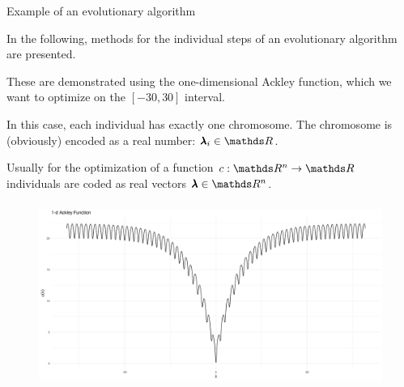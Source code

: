 \begin{frame}[allowframebreaks]{Example of an evolutionary algorithm}

In the following, methods for the individual steps of an evolutionary algorithm are presented.

\vspace{0.5cm}

These are demonstrated using the one-dimensional Ackley function, which we want to optimize on the $[-30, 30]$ interval.

\vspace{0.5cm}

In this case, each individual has exactly one chromosome. The chromosome is (obviously) encoded as a real number: $\xx_i \in \R$.

Usually for the optimization of a function $\f:\R^n \to \R$ individuals are coded as real vectors $\xx \in \R^n$.


\framebreak


\begin{center}
\begin{figure}
\includegraphics[width=\textwidth, height=6cm]{images/ea_ex1.png}
\end{figure}
\end{center}

\end{frame}


